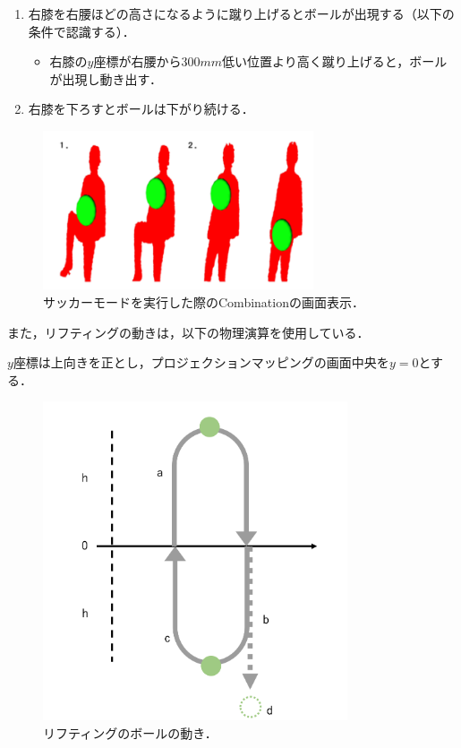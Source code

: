 \begin{enumerate}
    \item 右膝を右腰ほどの高さになるように蹴り上げるとボールが出現する（以下の条件で認識する）．
        \begin{itemize}
            \item 右膝の$y$座標が右腰から$300mm$低い位置より高く蹴り上げると，ボールが出現し動き出す．            
        \end{itemize}
    \item 右膝を下ろすとボールは下がり続ける．
\end{enumerate}

\vspace{1cm}
\begin{figure}[h]
    \centering
    \includegraphics[width=8cm]{image/soccer.png}
    \caption[サッカーモードを実行した際のCombinationの画面表示]{サッカーモードを実行した際のCombinationの画面表示．}
  \label{baseball}
\end{figure}

\vspace{1cm}

また，リフティングの動きは，以下の物理演算を使用している．

$y$座標は上向きを正とし，プロジェクションマッピングの画面中央を$y=0$とする．

\clearpage

\begin{figure}[h]
    \centering
    \includegraphics[width=9cm]{image/butsuri2.png}
    \caption[リフティングのボールの動き]{リフティングのボールの動き．}
  \label{butsuri}
\end{figure}



